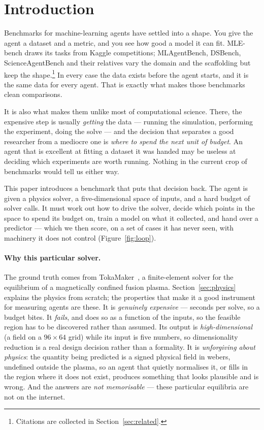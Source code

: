\section{Introduction}
\label{sec:intro}

Benchmarks for machine-learning agents have settled into a shape. You give the
agent a dataset and a metric, and you see how good a model it can fit. MLE-bench
draws its tasks from Kaggle competitions; MLAgentBench, DSBench,
ScienceAgentBench and their relatives vary the domain and the scaffolding but
keep the shape.\footnote{Citations are collected in
Section~\ref{sec:related}.} In every case the data exists before the agent
starts, and it is the same data for every agent. That is exactly what makes
those benchmarks clean comparisons.

It is also what makes them unlike most of computational science. There, the
expensive step is usually \emph{getting} the data --- running the simulation,
performing the experiment, doing the solve --- and the decision that separates a
good researcher from a mediocre one is \emph{where to spend the next unit of
budget}. An agent that is excellent at fitting a dataset it was handed may be
useless at deciding which experiments are worth running. Nothing in the current
crop of benchmarks would tell us either way.

This paper introduces a benchmark that puts that decision back. The agent is
given a physics solver, a five-dimensional space of inputs, and a hard budget of
solver calls. It must work out how to drive the solver, decide which points in
the space to spend its budget on, train a model on what it collected, and hand
over a predictor --- which we then score, on a set of cases it has never seen,
with machinery it does not control (Figure~\ref{fig:loop}).



\paragraph{Why this particular solver.}
The ground truth comes from TokaMaker~\citep{hansen2024tokamaker}, a
finite-element solver for the equilibrium of a magnetically confined fusion
plasma. Section~\ref{sec:physics} explains the physics from scratch; the
properties that make it a good instrument for measuring agents are these. It is
\emph{genuinely expensive} --- seconds per solve, so a budget bites. It
\emph{fails}, and does so as a function of the inputs, so the feasible region
has to be discovered rather than assumed. Its output is
\emph{high-dimensional} (a field on a $96\times64$ grid) while its input is
five numbers, so dimensionality reduction is a real design decision rather than
a formality. It is \emph{unforgiving about physics}: the quantity being
predicted is a signed physical field in webers, undefined outside the plasma, so
an agent that quietly normalises it, or fills in the region where it does not
exist, produces something that looks plausible and is wrong. And the answers are
\emph{not memorisable} --- these particular equilibria are not on the internet.

